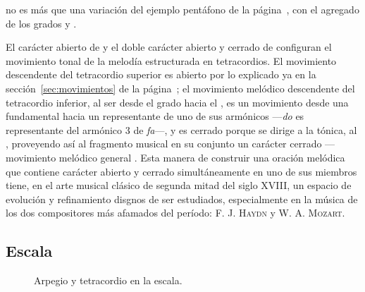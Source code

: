 \documentclass[a4paper,12pt]{article}
\begin{document}
\begin{multicols}{2}
  \noindent no es más que una variación del ejemplo pentáfono de la página~\pageref{ej:tetra-penta}, con el agregado de los grados  y .

  El carácter abierto de  y el doble carácter abierto y cerrado de  configuran el movimiento tonal de la melodía estructurada en tetracordios. El movimiento descendente del tetracordio superior es abierto por lo explicado ya en la sección~\ref{sec:movimientos} de la página~\pageref{sec:movimientos}; el movimiento melódico descendente del tetracordio inferior, al ser desde el  grado hacia el , es un movimiento desde una fundamental hacia un representante de uno de sus armónicos ---\emph{do} es representante del armónico 3 de \emph{fa}---, y es cerrado porque se dirige a la tónica, al , proveyendo así al fragmento musical en su conjunto un carácter cerrado ---movimiento melódico general . Esta manera de construir una oración melódica que contiene carácter abierto y cerrado simultáneamente en uno de sus miembros tiene, en el arte musical clásico de segunda mitad del siglo XVIII, un espacio de evolución y refinamiento disgnos de ser estudiados, especialmente en la música de los dos compositores más afamados del período: \textsc{F. J. Haydn} y \textsc{W. A. Mozart}.

  \subsection{Escala}\label{subsec:escala}
\end{multicols}

  \begin{figure}[ht]
  \centering
  \caption{Arpegio y tetracordio en la escala.}\label{fig:arp-tetra-escala}
  \end{figure}
\end{document}
